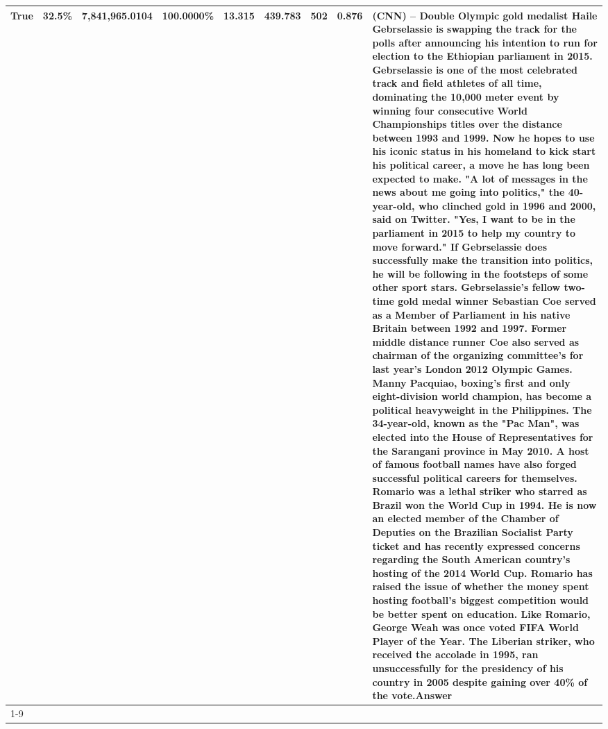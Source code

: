 \begin{table}[H]
{\begin{tabular}{lllrlllll}
True & 32.5\% & 7,841,965.0104 & \bfseries \color{red} 100.0000\% & 13.315 & 439.783 & 502 & 0.876 & (CNN) -- Double Olympic gold medalist Haile Gebrselassie is swapping the track for the polls after announcing his intention to run for election to the Ethiopian parliament in 2015. Gebrselassie is one of the most celebrated track and field athletes of all time, dominating the 10,000 meter event by winning four consecutive World Championships titles over the distance between 1993 and 1999. Now he hopes to use his iconic status in his homeland to kick start his political career, a move he has long been expected to make. "A lot of messages in the news about me going into politics," the 40-year-old, who clinched gold in 1996 and 2000, said on Twitter. "Yes, I want to be in the parliament in 2015 to help my country to move forward." If Gebrselassie does successfully make the transition into politics, he will be following in the footsteps of some other sport stars. Gebrselassie's fellow two-time gold medal winner Sebastian Coe served as a Member of Parliament in his native Britain between 1992 and 1997. Former middle distance runner Coe also served as chairman of the organizing committee's for last year's London 2012 Olympic Games. Manny Pacquiao, boxing's first and only eight-division world champion, has become a political heavyweight in the Philippines. The 34-year-old, known as the "Pac Man", was elected into the House of Representatives for the Sarangani province in May 2010. A host of famous football names have also forged successful political careers for themselves. Romario was a lethal striker who starred as Brazil won the World Cup in 1994. He is now an elected member of the Chamber of Deputies on the Brazilian Socialist Party ticket and has recently expressed concerns regarding the South American country's hosting of the 2014 World Cup. Romario has raised the issue of whether the money spent hosting football's biggest competition would be better spent on education. Like Romario, George Weah was once voted FIFA World Player of the Year. The Liberian striker, who received the accolade in 1995, ran unsuccessfully for the presidency of his country in 2005 despite gaining over 40\% of the vote.Answer \\
\cline{1-9}

\end{tabular}}
\end{table}
